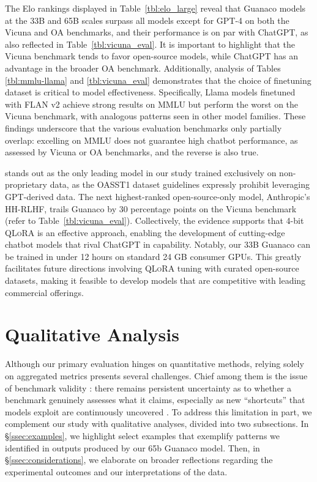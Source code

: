 The Elo rankings displayed in Table~\ref{tbl:elo_large} reveal that {Guanaco} models at the 33B and 65B scales surpass all models except for GPT-4 on both the Vicuna and OA benchmarks, and their performance is on par with ChatGPT, as also reflected in Table~\ref{tbl:vicuna_eval}. It is important to highlight that the Vicuna benchmark tends to favor open-source models, while ChatGPT has an advantage in the broader OA benchmark. Additionally, analysis of Tables \ref{tbl:mmlu-llama} and \ref{tbl:vicuna_eval} demonstrates that the choice of finetuning dataset is critical to model effectiveness. Specifically, Llama models finetuned with FLAN v2 achieve strong results on MMLU but perform the worst on the Vicuna benchmark, with analogous patterns seen in other model families. These findings underscore that the various evaluation benchmarks only partially overlap: excelling on MMLU does not guarantee high chatbot performance, as assessed by Vicuna or OA benchmarks, and the reverse is also true.

stands out as the only leading model in our study trained exclusively on non-proprietary data, as the OASST1 dataset guidelines expressly prohibit leveraging GPT-derived data. The next highest-ranked open-source-only model, Anthropic’s HH-RLHF, trails {Guanaco} by 30 percentage points on the Vicuna benchmark (refer to Table~\ref{tbl:vicuna_eval}). Collectively, the evidence supports that 4-bit \textsc{QLoRA} is an effective approach, enabling the development of cutting-edge chatbot models that rival ChatGPT in capability. Notably, our 33B {Guanaco} can be trained in under 12 hours on standard 24 GB consumer GPUs. This greatly facilitates future directions involving \textsc{QLoRA} tuning with curated open-source datasets, making it feasible to develop models that are competitive with leading commercial offerings.

\section{Qualitative Analysis}

Although our primary evaluation hinges on quantitative methods, relying solely on aggregated metrics presents several challenges. Chief among them is the issue of benchmark validity \citep{liao2021we}: there remains persistent uncertainty as to whether a benchmark genuinely assesses what it claims, especially as new “shortcuts” that models exploit are continuously uncovered \citep{gururangan2018annotation, poliak2018hypothesis}. To address this limitation in part, we complement our study with qualitative analyses, divided into two subsections. In \S\ref{ssec:examples}, we highlight select examples that exemplify patterns we identified in outputs produced by our 65b {Guanaco} model. Then, in \S\ref{ssec:considerations}, we elaborate on broader reflections regarding the experimental outcomes and our interpretations of the data.

